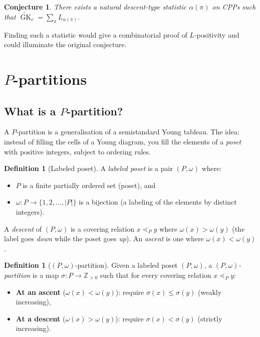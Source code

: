 \documentclass[11pt]{article}
\theoremstyle{plain}
\newtheorem{conjecture}[theorem]{Conjecture}
\theoremstyle{definition}
\newtheorem{definition}[theorem]{Definition}
\theoremstyle{remark}
\newcommand{\Z}{\mathbb{Z}}
\newcommand{\GK}{\operatorname{GK}}
\begin{document}
\begin{conjecture}\label{conj:descent}
There exists a natural descent-type statistic $\alpha(\pi)$ on
CPPs such that
$\widetilde{\GK}_c = \sum_\pi L_{\alpha(\pi)}$.
\end{conjecture}

Finding such a statistic would give a combinatorial proof of
$L$-positivity and could illuminate the original conjecture.


\section{$P$-partitions}
\label{sec:P-partitions}


\subsection{What is a $P$-partition?}

A $P$-partition is a generalisation of a semistandard Young
tableau.  The idea: instead of filling the cells of a Young
diagram, you fill the elements of a \emph{poset} with positive
integers, subject to ordering rules.

\begin{definition}[Labeled poset]\label{def:labeled-poset}
A \emph{labeled poset} is a pair $(P, \omega)$ where:
\begin{itemize}
\item $P$ is a finite partially ordered set (poset), and
\item $\omega : P \to \{1, 2, \ldots, |P|\}$ is a bijection
  (a labeling of the elements by distinct integers).
\end{itemize}
A \emph{descent} of $(P,\omega)$ is a covering relation
$x \lessdot_P y$ where $\omega(x) > \omega(y)$
(the label goes \emph{down} while the poset goes \emph{up}).
An \emph{ascent} is one where $\omega(x) < \omega(y)$.
\end{definition}

\begin{definition}[$(P,\omega)$-partition]\label{def:P-partition}
Given a labeled poset $(P,\omega)$, a \emph{$(P,\omega)$-partition}
is a map $\sigma : P \to \Z_{> 0}$ such that for every
covering relation $x \lessdot_P y$:
\begin{itemize}
\item \textbf{At an ascent}
  ($\omega(x) < \omega(y)$):
  require $\sigma(x) \leq \sigma(y)$ \quad (weakly increasing),
\item \textbf{At a descent}
  ($\omega(x) > \omega(y)$):
  require $\sigma(x) < \sigma(y)$ \quad (strictly increasing).
\end{itemize}
\end{definition}
\end{document}
